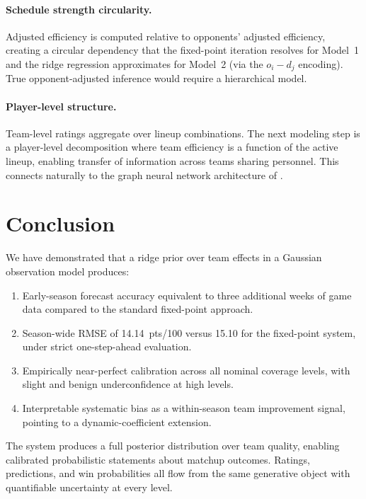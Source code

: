 \documentclass[11pt]{article}
\begin{document}
\paragraph{Schedule strength circularity.}  Adjusted efficiency is computed
relative to opponents' adjusted efficiency, creating a circular dependency that
the fixed-point iteration resolves for Model~1 and the ridge regression
approximates for Model~2 (via the $o_i - d_j$ encoding).  True opponent-adjusted
inference would require a hierarchical model.

\paragraph{Player-level structure.}  Team-level ratings aggregate over lineup
combinations.  The next modeling step is a player-level decomposition where
team efficiency is a function of the active lineup, enabling transfer of
information across teams sharing personnel.  This connects naturally to the
graph neural network architecture of \citet{danielson2024deeprapm}.

\section{Conclusion}

We have demonstrated that a ridge prior over team effects in a Gaussian
observation model produces:
\begin{enumerate}
  \item Early-season forecast accuracy equivalent to three additional weeks of
    game data compared to the standard fixed-point approach.
  \item Season-wide RMSE of 14.14~pts/100 versus 15.10 for the fixed-point
    system, under strict one-step-ahead evaluation.
  \item Empirically near-perfect calibration across all nominal coverage levels,
    with slight and benign underconfidence at high levels.
  \item Interpretable systematic bias as a within-season team improvement
    signal, pointing to a dynamic-coefficient extension.
\end{enumerate}

The system produces a full posterior distribution over team quality, enabling
calibrated probabilistic statements about matchup outcomes.  Ratings, predictions,
and win probabilities all flow from the same generative object with
quantifiable uncertainty at every level.
\end{document}
